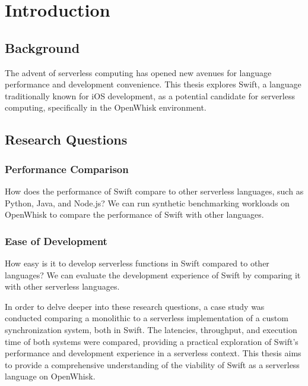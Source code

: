 \chapter{Introduction}
\etocsettocstyle{\rule{\textwidth}{1pt}}{\rule{\textwidth}{1pt}} %
\localtableofcontents
\section{Background}
The advent of serverless computing has opened new avenues for language performance and development convenience. This thesis explores Swift, a language traditionally known for iOS development, as a potential candidate for serverless computing, specifically in the OpenWhisk environment.
\section{Research Questions}
\subsection{Performance Comparison}
How does the performance of Swift compare to other serverless languages, such as Python, Java, and Node.js? We can run synthetic benchmarking workloads on OpenWhisk to compare the performance of Swift with other languages.
\subsection{Ease of Development}
How easy is it to develop serverless functions in Swift compared to other languages? We can evaluate the development experience of Swift by comparing it with other serverless languages.

In order to delve deeper into these research questions, a case study was conducted comparing a monolithic to a serverless implementation of a custom synchronization system, both in Swift. The latencies, throughput, and execution time of both systems were compared, providing a practical exploration of Swift's performance and development experience in a serverless context. This thesis aims to provide a comprehensive understanding of the viability of Swift as a serverless language on OpenWhisk.